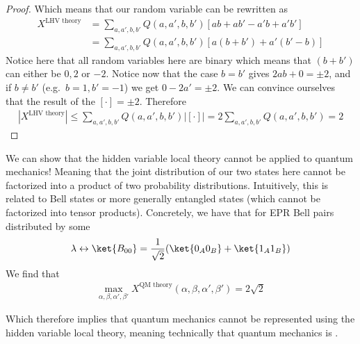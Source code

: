 \begin{proof}
	Which means that our random variable can be rewritten as 
	\begin{align*} 
		X^{\text{LHV theory}} &=  \sum_{a, a', b, b'}Q\left(a, a', b, b'\right)\left[ab + ab' - a'b + a'b'\right]\\
		&= \sum_{a, a', b, b'}Q\left(a, a', b, b'\right)\left[a\left(b + b'\right) + a'\left(b' - b\right)\right]
	\end{align*}
	Notice here that all random variables here are binary which means that $\left(b + b'\right)$ can either be $0, 2$ or $-2$. Notice now that the case $b = b'$ gives $2ab + 0 = \pm 2$, and if $b \neq b'$ (e.g.\ $b = 1, b' = -1$) we get $0 - 2a' = \pm 2$. We can convince ourselves that the result of the $\left[\cdot \right] = \pm 2$. Therefore
	\begin{align*} 
		\left|X^{\text{LHV theory}}\right| \leq \sum_{a, a', b, b'} Q\left(a, a', b, b'\right) \left|\left[\cdot\right]\right| = 2 \sum_{a, a', b, b'} Q\left(a, a', b, b'\right) = 2
	\end{align*}
\end{proof}

 We can show that the hidden variable local theory cannot be applied to quantum mechanics! Meaning that the joint distribution of our two states here cannot be factorized into a product of two probability distributions. Intuitively, this is related to Bell states or more generally entangled states (which cannot be factorized into tensor products). Concretely, we have that for EPR Bell pairs distributed by some
\begin{align*} 
	\lambda \leftrightarrow \ket{B_{00}}  = \frac{1}{\sqrt{2}}\left(\ket{0_A0_B} + \ket{1_A1_B}\right)
\end{align*}
We find that 
\begin{align*} 
	\max_{\alpha, \beta, \alpha', \beta'} X^{\text{QM theory}}\left(\alpha, \beta, \alpha', \beta'\right) = 2 \sqrt{2} 
\end{align*}

Which therefore implies that quantum mechanics cannot be represented using the hidden variable local theory, meaning technically that quantum mechanics is .



